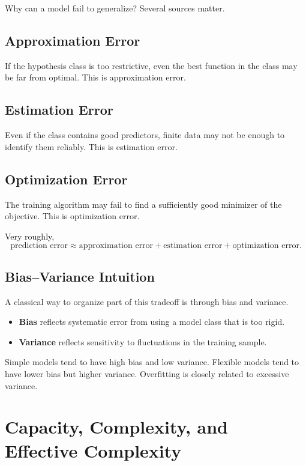 Why can a model fail to generalize? Several sources matter.

\subsection{Approximation Error}

If the hypothesis class is too restrictive, even the best function in the class may be far from optimal. This is approximation error.

\subsection{Estimation Error}

Even if the class contains good predictors, finite data may not be enough to identify them reliably. This is estimation error.

\subsection{Optimization Error}

The training algorithm may fail to find a sufficiently good minimizer of the objective. This is optimization error.

Very roughly,
\[
\text{prediction error}
\approx
\text{approximation error}
+
\text{estimation error}
+
\text{optimization error}.
\]

\subsection{Bias--Variance Intuition}

A classical way to organize part of this tradeoff is through bias and variance.

\begin{itemize}
    \item \textbf{Bias} reflects systematic error from using a model class that is too rigid.
    \item \textbf{Variance} reflects sensitivity to fluctuations in the training sample.
\end{itemize}

Simple models tend to have high bias and low variance. Flexible models tend to have lower bias but higher variance. Overfitting is closely related to excessive variance.

\section{Capacity, Complexity, and Effective Complexity}

